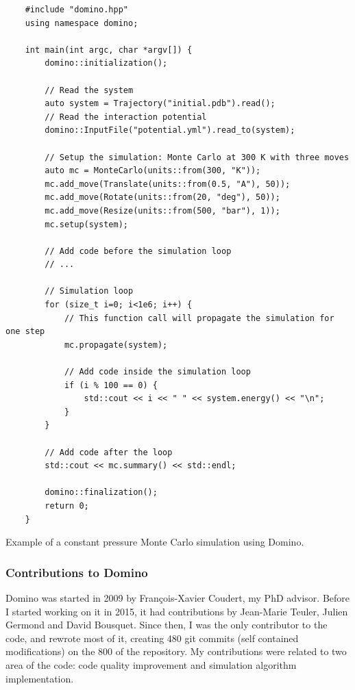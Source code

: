 \documentclass[thesis]{subfiles}
\begin{document}
\begin{listing}[ht]
    \begin{verbatim}
    #include "domino.hpp"
    using namespace domino;

    int main(int argc, char *argv[]) {
        domino::initialization();

        // Read the system
        auto system = Trajectory("initial.pdb").read();
        // Read the interaction potential
        domino::InputFile("potential.yml").read_to(system);

        // Setup the simulation: Monte Carlo at 300 K with three moves
        auto mc = MonteCarlo(units::from(300, "K"));
        mc.add_move(Translate(units::from(0.5, "A"), 50));
        mc.add_move(Rotate(units::from(20, "deg"), 50));
        mc.add_move(Resize(units::from(500, "bar"), 1));
        mc.setup(system);

        // Add code before the simulation loop
        // ...

        // Simulation loop
        for (size_t i=0; i<1e6; i++) {
            // This function call will propagate the simulation for one step
            mc.propagate(system);

            // Add code inside the simulation loop
            if (i % 100 == 0) {
                std::cout << i << " " << system.energy() << "\n";
            }
        }

        // Add code after the loop
        std::cout << mc.summary() << std::endl;

        domino::finalization();
        return 0;
    }
    \end{verbatim}
    \caption{Example of a constant pressure Monte Carlo simulation using Domino.}
    \label{code:simulation-example}
\end{listing}

\subsubsection{Contributions to Domino}

Domino was started in 2009 by François-Xavier Coudert, my PhD advisor. Before I
started working on it in 2015, it had contributions by Jean-Marie Teuler, Julien
Germond and David Bousquet. Since then, I was the only contributor to the code,
and rewrote most of it, creating 480 git commits (self contained modifications)
on the 800 of the repository.  My contributions were related to two area of the
code: code quality improvement and simulation algorithm implementation.
\end{document}
